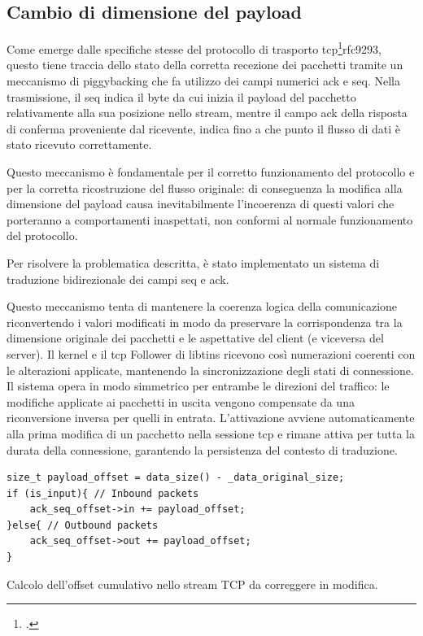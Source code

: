 \subsection{Cambio di dimensione del payload}

Come emerge dalle specifiche stesse del protocollo di trasporto \gls{tcp}\footcite{RFC9293, Transmission Control Protocol (TCP)}{rfc9293}, questo tiene traccia dello stato della corretta recezione dei pacchetti tramite un meccanismo di piggybacking che fa utilizzo dei campi numerici \gls{ack} e \gls{seq}.
Nella trasmissione, il \gls{seq} indica il byte da cui inizia il payload del pacchetto relativamente alla sua posizione nello stream, mentre il campo \gls{ack} della risposta di conferma proveniente dal ricevente, indica fino a che punto il flusso di dati è stato ricevuto correttamente.

Questo meccanismo è fondamentale per il corretto funzionamento del protocollo e per la corretta ricostruzione del flusso originale: di conseguenza la modifica alla dimensione del payload causa inevitabilmente l'incoerenza di questi valori che porteranno a comportamenti inaspettati, non conformi al normale funzionamento del protocollo.

Per risolvere la problematica descritta, è stato implementato un sistema di traduzione bidirezionale dei campi \gls{seq} e \gls{ack}.

Questo meccanismo tenta di mantenere la coerenza logica della comunicazione riconvertendo i valori modificati in modo da preservare la corrispondenza tra la dimensione originale dei pacchetti e le aspettative del client (e viceversa del server).
Il kernel e il \gls{tcp} Follower di libtins ricevono così numerazioni coerenti con le alterazioni applicate, mantenendo la sincronizzazione degli stati di connessione.
Il sistema opera in modo simmetrico per entrambe le direzioni del traffico: le modifiche applicate ai pacchetti in uscita vengono compensate da una riconversione inversa per quelli in entrata. L'attivazione avviene automaticamente alla prima modifica di un pacchetto nella sessione \gls{tcp} e rimane attiva per tutta la durata della connessione, garantendo la persistenza del contesto di traduzione.

\begin{listing}[H]
\begin{verbatim}
size_t payload_offset = data_size() - _data_original_size;
if (is_input){ // Inbound packets
    ack_seq_offset->in += payload_offset;
}else{ // Outbound packets
    ack_seq_offset->out += payload_offset;
}
\end{verbatim}
\vspace{-1em}
\caption{Calcolo dell'offset cumulativo nello stream TCP da correggere in modifica.}\label{lst:tcp_ack_seq_transl}
\end{listing}

